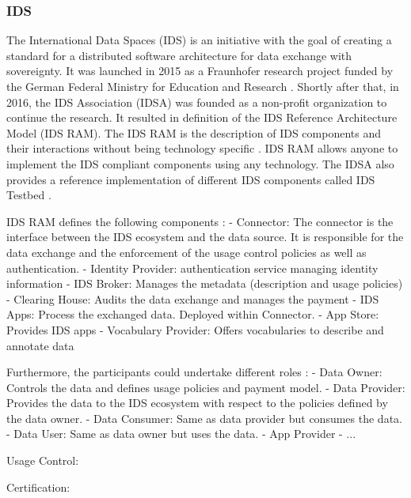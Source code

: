 \documentclass{article}
\begin{document}
\subsubsection*{IDS}
The International Data Spaces (IDS) is an initiative with the goal of creating a standard for a distributed software architecture for data exchange with sovereignty. It was launched in 2015 as a Fraunhofer research project funded by the German Federal Ministry for Education and Research \cite{otto_evolution_2022}. Shortly after that, in 2016, the IDS Association (IDSA) was founded as a non-profit organization to continue the research. It resulted in definition of the IDS Reference Architecture Model (IDS RAM). The IDS RAM is the description of IDS components and their interactions without being technology specific \cite{otto_evolution_2022}. IDS RAM allows anyone to implement the IDS compliant components using any technology. The IDSA also provides a reference implementation of different IDS components called IDS Testbed \cite{noauthor_ids_2022}. 

IDS RAM defines the following components \cite{pettenpohl_international_2022}:
- Connector: The connector is the interface between the IDS ecosystem and the data source. It is responsible for the data exchange and the enforcement of the usage control policies as well as authentication.
- Identity Provider: authentication service managing identity information
- IDS Broker: Manages the metadata (description and usage policies)
- Clearing House: Audits the data exchange and manages the payment
- IDS Apps: Process the exchanged data. Deployed within Connector.
- App Store: Provides IDS apps
- Vocabulary Provider: Offers vocabularies to describe and annotate data

Furthermore, the participants could undertake different roles \cite{pettenpohl_international_2022}:
- Data Owner: Controls the data and defines usage policies and payment model.
- Data Provider: Provides the data to the IDS ecosystem with respect to the policies defined by the data owner.
- Data Consumer: Same as data provider but consumes the data.
- Data User: Same as data owner but uses the data.
- App Provider
- ...


Usage Control:

Certification:
\end{document}
